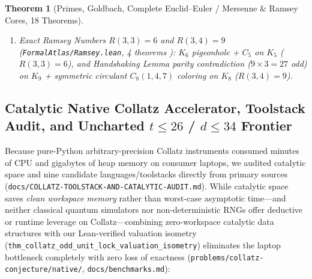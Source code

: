 \documentclass[11pt,reqno]{amsart}
\theoremstyle{plain}
\newtheorem{theorem}{Theorem}[section]
\theoremstyle{definition}
\newcommand{\code}[1]{{\upshape\nolinkurl{#1}}}
\begin{document}
\begin{theorem}[Primes, Goldbach, Complete Euclid--Euler / Mersenne \& Ramsey Cores, 18 Theorems]
\begin{enumerate}
\begin{itemize}
        ($2^a \equiv 2^b \equiv 1 \pmod q \implies 2^{\gcd(a,b)} \equiv 1 \pmod q$), every odd prime
        $p \ge 3$ and every prime divisor $q \mid (2^p - 1)$ satisfy $2p \mid (q - 1)$
        (witnessed concretely at $23 \mid 2^{11}-1$, $22 \mid 23 - 1$).
    \end{itemize}
  \item \emph{Exact Ramsey Numbers $R(3,3)=6$ and $R(3,4)=9$ (\code{FormalAtlas/Ramsey.lean}, 4 theorems \cite{ramsey1930,greenwoodgleason1955}):}
    $K_6$ pigeonhole + $C_5$ on $K_5$ ($R(3,3)=6$), and Handshaking Lemma parity contradiction
    ($9 \times 3 = 27$ odd) on $K_9$ + symmetric circulant $C_8(1,4,7)$ coloring on $K_8$ ($R(3,4)=9$).
\end{enumerate}
\end{theorem}

\subsection{Catalytic Native Collatz Accelerator, Toolstack Audit, and Uncharted \texorpdfstring{$t \le 26$ / $d \le 34$}{t <= 26 / d <= 34} Frontier}\label{sec:catalytic}
Because pure-Python arbitrary-precision Collatz instruments consumed minutes of CPU and gigabytes
of heap memory on consumer laptops, we audited catalytic space \cite{buhrman2014catalytic,vinciguerra2026catalytic}
and nine candidate languages/toolstacks directly from primary sources
(\code{docs/COLLATZ-TOOLSTACK-AND-CATALYTIC-AUDIT.md}). While catalytic space saves \emph{clean
workspace memory} rather than worst-case asymptotic time---and neither classical quantum simulators
nor non-deterministic RNGs offer deductive or runtime leverage on Collatz---combining zero-workspace
catalytic data structures with our Lean-verified valuation isometry
(\code{thm_collatz_odd_unit_lock_valuation_isometry}) eliminates the laptop bottleneck completely
with zero loss of exactness (\code{problems/collatz-conjecture/native/}, \code{docs/benchmarks.md}):
\end{document}
